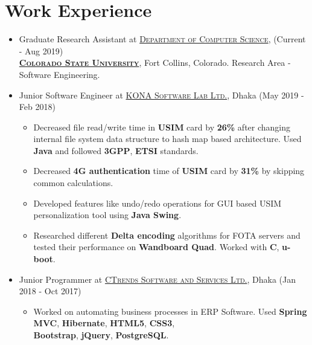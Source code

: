 \documentclass[a4paper,10pt]{article}
\begin{document}
\section{Work Experience}
\begin{itemize}
    \item Graduate Research Assistant at \href{http://compsci.colostate.edu}{\textsc{Department of Computer Science}}, \hfill (Current - Aug 2019) \\
    \href{https://www.co slostate.edu}{\textsc{\textbf{Colorado State University}}}, Fort Collins, Colorado.
    Research Area - Software Engineering.
    
    \item Junior Software Engineer at \href{http://www.konai.com}{\textsc{KONA Software Lab Ltd.}}, Dhaka \hfill (May 2019 - Feb 2018)
    \begin{itemize}%
         \item Decreased file read/write time in \textbf{USIM} card by \textbf{26\%} after changing internal file system data structure to hash map based architecture. Used \textbf{Java} and followed \textbf{3GPP}, \textbf{ETSI} standards.
         \item Decreased \textbf{4G authentication} time of \textbf{USIM} card by \textbf{31\%} by skipping common calculations.
         \item Developed features like undo/redo operations for GUI based USIM personalization tool using \textbf{Java Swing}.
         \item Researched different \textbf{Delta encoding} algorithms for FOTA servers and tested their performance on \textbf{Wandboard Quad}. Worked with \textbf{C}, \textbf{u-boot}.
    \end{itemize}
    
    \item Junior Programmer at \href{http://www.ctrends-software.com}{\textsc{CTrends Software and Services Ltd.}}, Dhaka \hfill (Jan 2018 - Oct 2017)
    \begin{itemize}
         \item Worked on automating business processes in ERP Software. Used \textbf{Spring MVC}, \textbf{Hibernate}, \textbf{HTML5}, \textbf{CSS3},\\ \textbf{Bootstrap}, \textbf{jQuery}, \textbf{PostgreSQL}.
     \end{itemize}
     
\end{itemize}
\end{document}

